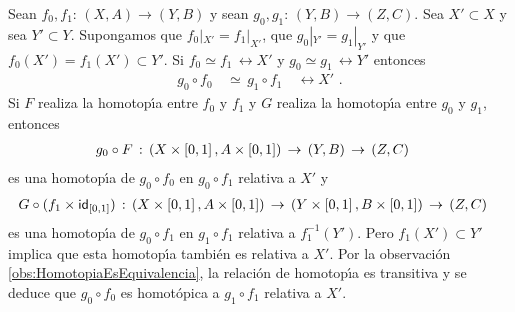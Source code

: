 \begin{obsComposicionesDeHomotopicasSonHomotopicas}%
	\label{obs:composicionesdehomotopicassonhomotopicas}
	Sean $f_{0},f_{1}:\,(X,A)\rightarrow (Y,B)$ y sean
	$g_{0},g_{1}:\,(Y,B)\rightarrow (Z,C)$. Sea $X'\subset X$ y sea
	$Y'\subset Y$. Supongamos que $f_{0}|_{X'}=f_{1}|_{X'}$, que
	$g_{0}|_{Y'}=g_{1}|_{Y'}$ y que $f_{0}(X')=f_{1}(X')\subset Y'$.
	Si $f_{0}\simeq f_{1}\,\rel{X'}$ y $g_{0}\simeq g_{1}\,\rel{Y'}$
	entonces
	\begin{align*}
		g_{0}\circ f_{0} & \,\simeq\, g_{1}\circ f_{1}\quad\rel{X'}
		\text{ .}
	\end{align*}
	Si $F$ realiza la homotop\'{\i}a entre $f_{0}$ y $f_{1}$ y $G$ realiza
	la homotop\'{\i}a entre $g_{0}$ y $g_{1}$, entonces
	\begin{align*}
		g_{0}\circ F & \,:\,(X\times\left[0,1\right],A\times\left[0,1\right])
			\,\rightarrow\,(Y,B)\,\rightarrow\,(Z,C)
	\end{align*}
	es una homotop\'{\i}a de $g_{0}\circ f_{0}$ en $g_{0}\circ f_{1}$
	relativa a $X'$ y
	\begin{align*}
		G\circ (f_{1}\times\mathsf{id}_{\left[0,1\right]}) & \,:\,
			(X\times\left[0,1\right],A\times\left[0,1\right])\,\rightarrow\,
			(Y\times\left[0,1\right],B\times\left[0,1\right])\,\rightarrow\,
			(Z,C)
	\end{align*}
	es una homotop\'{\i}a de $g_{0}\circ f_{1}$ en $g_{1}\circ f_{1}$
	relativa a $f_{1}^{-1}(Y')$. Pero $f_{1}(X')\subset Y'$ implica que
	esta homotop\'{\i}a tambi\'{e}n es relativa a $X'$. Por la
	observaci\'{o}n \ref{obs:HomotopiaEsEquivalencia}, la relaci\'{o}n de
	homotop\'{\i}a es transitiva y se deduce que $g_{0}\circ f_{0}$ es
	homot\'{o}pica a $g_{1}\circ f_{1}$ relativa a $X'$.
\end{obsComposicionesDeHomotopicasSonHomotopicas}

